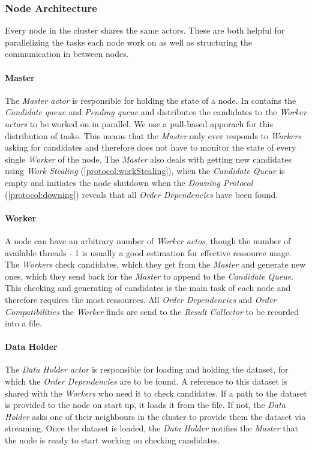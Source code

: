 \subsubsection{Node Architecture}
Every node in the cluster shares the same actors.
These are both helpful for parallelizing the tasks each node work on as well as structuring the communication in between nodes.
\paragraph{Master} 
The \emph{Master actor} is responsible for holding the state of a node.
In contains the \emph{Candidate queue} and \emph{Pending queue} and distributes the candidates to the \emph{Worker actors} to be worked on in parallel. 
We use a pull-based apporach for this distribution of tasks.
This means that the \emph{Master} only ever responds to \emph{Workers} asking for candidates and therefore does not have to monitor the state of every single \emph{Worker} of the node.
The \emph{Master} also deals with getting new candidates using \emph{Work Stealing} (\ref{protocol:workStealing}), when the \emph{Candidate Queue} is empty and initiates the node shutdown when the \emph{Downing Protocol} (\ref{protocol:downing}) reveals that all \emph{Order Dependencies} have been found.

\paragraph{Worker}
A node can have an arbitrary number of \emph{Worker actos}, though the number of available threads - 1 is usually a good estimation for effective ressource usage.
The \emph{Workers} check candidates, which they get from the \emph{Master} and generate new ones, which they send back for the \emph{Master} to append to the \emph{Candidate Queue}.
This checking and generating of candidates is the main task of each node and therefore requires the most ressources.
All \emph{Order Dependencies} and \emph{Order Compatibilities} the \emph{Worker} finds are send to the \emph{Result Collector} to be recorded into a file. 

\paragraph{Data Holder}
The \emph{Data Holder actor} is responsible for loading and holding the dataset, for which the \emph{Order Dependencies} are to be found. 
A reference to this dataset is shared with the \emph{Workers} who need it to check candidates.
If a path to the dataset is provided to the node on start up, it loads it from the file.
If not, the \emph{Data Holder} asks one of their neighbours in the cluster to provide them the dataset via streaming.
Once the dataset is loaded, the \emph{Data Holder} notifies the \emph{Master} that the node is ready to start working on checking candidates. 


